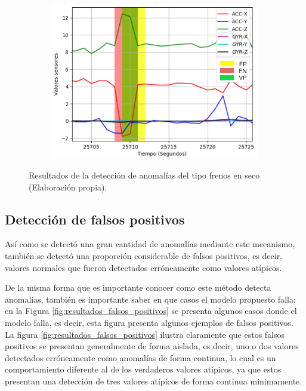 \begin{figure}[H]
{\begin{varwidth}{\textwidth}
\begin{subfigure}[h]{0.45\textwidth}
            \includegraphics[width=\textwidth]{imagenes/Cap5/freno3}
        \end{subfigure} 
        \end{varwidth}}
        \caption{Resultados de la detecci\'{o}n de anomal\'{i}as del tipo frenos en seco (Elaboraci\'{o}n propia).}
		\label{fig:resultados_frenos}
    \end{figure}


\subsection{Detecci\'{o}n de falsos positivos}

As\'{i} como se detect\'{o} una gran cantidad de anomal\'{i}as mediante este mecanismo, tambi\'{e}n se detect\'{o} una proporci\'{o}n considerable de falsos positivos, es decir, valores normales que fueron detectados err\'{o}neamente como valores at\'{i}picos.

\vspace{5mm} %

De la misma forma que es importante conocer como este m\'{e}todo detecta anomal\'{i}as, tambi\'{e}n es importante saber en que casos el modelo propuesto falla; en la Figura \ref{fig:resultados_falsos_positivos} se presenta algunos casos donde el modelo falla, es decir, esta figura presenta algunos ejemplos de falsos positivos. La figura \ref{fig:resultados_falsos_positivos} ilustra claramente que estos falsos positivos se presentan generalmente de forma aislada, es decir, uno o dos valores detectados err\'{o}neamente como anomal\'{i}as de forma continua, lo cual es un comportamiento diferente al de los verdaderos valores at\'{i}picos, ya que estos presentan una detecci\'{o}n de tres valores at\'{i}picos de forma continua minimamente.

